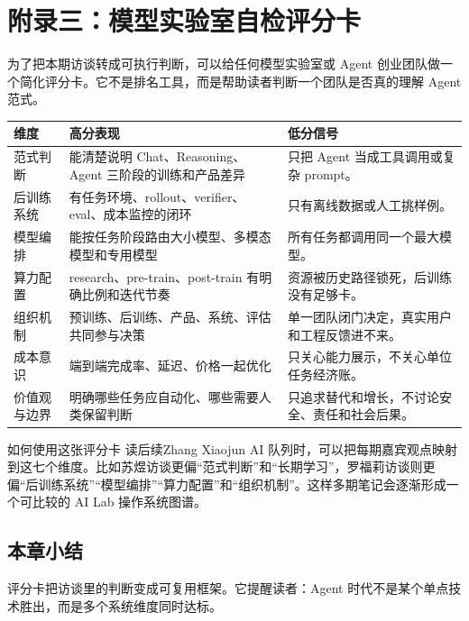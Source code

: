 \section{附录三：模型实验室自检评分卡}

为了把本期访谈转成可执行判断，可以给任何模型实验室或 Agent 创业团队做一个简化评分卡。它不是排名工具，而是帮助读者判断一个团队是否真的理解 Agent 范式。

\noindent\begin{longtable}{p{}p{}p{}}
\toprule
维度 & 高分表现 & 低分信号 \\
\midrule
范式判断 & 能清楚说明 Chat、Reasoning、Agent 三阶段的训练和产品差异 & 只把 Agent 当成工具调用或复杂 prompt。 \\
后训练系统 & 有任务环境、rollout、verifier、eval、成本监控的闭环 & 只有离线数据或人工挑样例。 \\
模型编排 & 能按任务阶段路由大小模型、多模态模型和专用模型 & 所有任务都调用同一个最大模型。 \\
算力配置 & research、pre-train、post-train 有明确比例和迭代节奏 & 资源被历史路径锁死，后训练没有足够卡。 \\
组织机制 & 预训练、后训练、产品、系统、评估共同参与决策 & 单一团队闭门决定，真实用户和工程反馈进不来。 \\
成本意识 & 端到端完成率、延迟、价格一起优化 & 只关心能力展示，不关心单位任务经济账。 \\
价值观与边界 & 明确哪些任务应自动化、哪些需要人类保留判断 & 只追求替代和增长，不讨论安全、责任和社会后果。 \\
\bottomrule
\end{longtable}

\begin{knowledgebox}{如何使用这张评分卡}
读后续Zhang Xiaojun AI 队列时，可以把每期嘉宾观点映射到这七个维度。比如苏煜访谈更偏“范式判断”和“长期学习”，罗福莉访谈则更偏“后训练系统”“模型编排”“算力配置”和“组织机制”。这样多期笔记会逐渐形成一个可比较的 AI Lab 操作系统图谱。
\end{knowledgebox}

\subsection{本章小结}

评分卡把访谈里的判断变成可复用框架。它提醒读者：Agent 时代不是某个单点技术胜出，而是多个系统维度同时达标。

